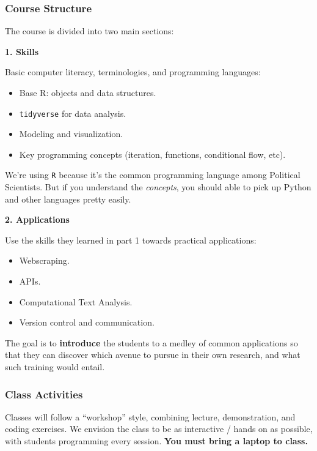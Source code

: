 \documentclass[]{book}
\providecommand{\tightlist}{%
  \setlength{\itemsep}{0pt}\setlength{\parskip}{0pt}}
\begin{document}
\subsubsection*{Course Structure}\label{course-structure-1}

The course is divided into two main sections:

\textbf{1. Skills}

Basic computer literacy, terminologies, and programming languages:

\begin{itemize}
\tightlist
\item
  Base R: objects and data structures.
\item
  \texttt{tidyverse} for data analysis.
\item
  Modeling and visualization.
\item
  Key programming concepts (iteration, functions, conditional flow,
  etc).
\end{itemize}

We're using \texttt{R} because it's the common programming language
among Political Scientists. But if you understand the \emph{concepts},
you should able to pick up Python and other languages pretty easily.

\textbf{2. Applications}

Use the skills they learned in part 1 towards practical applications:

\begin{itemize}
\tightlist
\item
  Webscraping.
\item
  APIs.
\item
  Computational Text Analysis.
\item
  Version control and communication.
\end{itemize}

The goal is to \textbf{introduce} the students to a medley of common
applications so that they can discover which avenue to pursue in their
own research, and what such training would entail.

\subsubsection*{Class Activities}\label{class-activities}

Classes will follow a ``workshop'' style, combining lecture,
demonstration, and coding exercises. We envision the class to be as
interactive / hands on as possible, with students programming every
session. \textbf{You must bring a laptop to class.}
\end{document}

